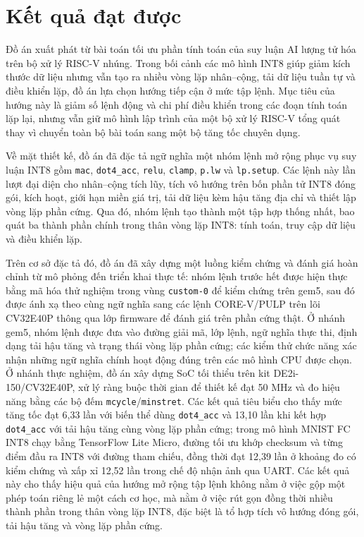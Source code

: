 \documentclass[../DoAn.tex]{subfiles}
\begin{document}
\section{Kết quả đạt được}

Đồ án xuất phát từ bài toán tối ưu phần tính toán của suy luận AI lượng tử hóa
trên bộ xử lý RISC-V nhúng. Trong bối cảnh các mô hình INT8 giúp giảm kích
thước dữ liệu nhưng vẫn tạo ra nhiều vòng lặp nhân--cộng, tải dữ liệu tuần tự
và điều khiển lặp, đồ án lựa chọn hướng tiếp cận ở mức tập lệnh. Mục tiêu của
hướng này là giảm số lệnh động và chi phí điều khiển trong các đoạn tính toán
lặp lại, nhưng vẫn giữ mô hình lập trình của một bộ xử lý RISC-V tổng quát thay
vì chuyển toàn bộ bài toán sang một bộ tăng tốc chuyên dụng.

Về mặt thiết kế, đồ án đã đặc tả ngữ nghĩa một nhóm lệnh mở rộng phục vụ suy
luận INT8 gồm
\texttt{mac}, \texttt{dot4\_acc}, \texttt{relu}, \texttt{clamp}, \texttt{p.lw}
và \texttt{lp.setup}. Các lệnh này lần lượt đại diện cho nhân--cộng tích
lũy, tích vô hướng trên bốn phần tử INT8 đóng gói, kích hoạt, giới hạn miền giá
trị, tải dữ liệu kèm hậu tăng địa chỉ và thiết lập vòng lặp phần cứng. Qua đó,
nhóm lệnh tạo thành một tập hợp thống nhất, bao quát ba thành phần chính
trong thân vòng lặp INT8: tính toán, truy cập dữ liệu và điều khiển lặp.

Trên cơ sở đặc tả đó, đồ án đã xây dựng một luồng kiểm chứng và đánh giá hoàn
chỉnh từ mô phỏng đến triển khai thực tế: nhóm lệnh trước hết được hiện
thực bằng mã hóa thử nghiệm trong vùng \texttt{custom-0} để kiểm chứng trên
gem5, sau đó được ánh xạ theo cùng ngữ nghĩa sang các lệnh CORE-V/PULP trên lõi
CV32E40P thông qua lớp firmware để đánh giá trên phần cứng thật. Ở nhánh gem5,
nhóm lệnh được đưa vào đường giải mã, lớp lệnh, ngữ nghĩa thực thi, định dạng
tải hậu tăng và trạng thái vòng lặp phần cứng; các kiểm thử chức năng xác nhận
những ngữ nghĩa chính hoạt động đúng trên các mô hình CPU được chọn. Ở nhánh
thực nghiệm, đồ án xây dựng SoC tối thiểu trên kit
DE2i-150/CV32E40P, xử lý ràng buộc thời gian để thiết kế đạt 50 MHz và đo hiệu
năng bằng các bộ đếm \texttt{mcycle}/\texttt{minstret}. Các kết quả tiêu biểu
cho thấy mức tăng tốc đạt 6,33 lần với biến thể dùng \texttt{dot4\_acc} và
13,10 lần khi kết hợp \texttt{dot4\_acc} với tải hậu tăng cùng vòng lặp phần
cứng; trong mô hình MNIST FC INT8 chạy bằng TensorFlow Lite Micro, đường tối ưu
khớp checksum và từng điểm đầu ra INT8 với đường tham chiếu, đồng thời đạt
12,39 lần ở khoảng đo có kiểm chứng và xấp xỉ 12,52 lần trong chế độ nhận ảnh
qua UART. Các kết quả này cho thấy hiệu quả của hướng mở rộng tập lệnh không
nằm ở việc gộp một phép toán riêng lẻ một cách cơ học, mà nằm ở việc rút gọn
đồng thời nhiều thành phần trong thân vòng lặp INT8, đặc biệt là tổ hợp tích vô
hướng đóng gói, tải hậu tăng và vòng lặp phần cứng.
\end{document}
